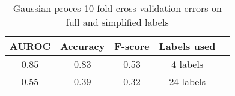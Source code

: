 \begin{table}[H]
    \centering
\begin{tabular}{|c|c|c|c|c|}
    \hline
    AUROC & Accuracy & F-score & Labels used\\\hline
    0.85 & 0.83 & 0.53 & 4 labels \\
    0.55 & 0.39 & 0.32 & 24 labels \\
    \hline
\end{tabular}
    \caption{Gaussian proces 10-fold cross validation errors on full and simplified labels}
    \label{table:gperrs}
\end{table}

% 

